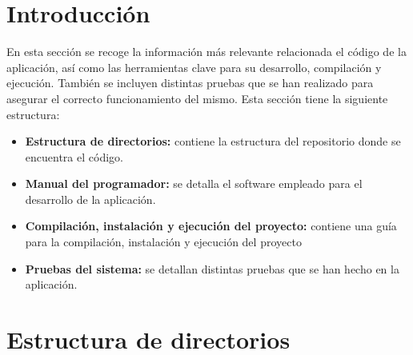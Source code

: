 
\section{Introducción}
En esta sección se recoge la información más relevante relacionada el código de la aplicación, así como las herramientas clave para su desarrollo, compilación y ejecución. También se incluyen distintas pruebas que se han realizado para asegurar el correcto funcionamiento del mismo.
Esta sección tiene la siguiente estructura:
\begin{itemize}
    \item \textbf{Estructura de directorios:} contiene la estructura del repositorio donde se encuentra el código.
    \item \textbf{Manual del programador:} se detalla el software empleado para el desarrollo de la aplicación.
    \item \textbf{Compilación, instalación y ejecución del proyecto:} contiene una guía para la compilación, instalación y ejecución del proyecto
    \item \textbf{Pruebas del sistema:} se detallan distintas pruebas que se han hecho en la aplicación.
\end{itemize}

\section{Estructura de directorios}

